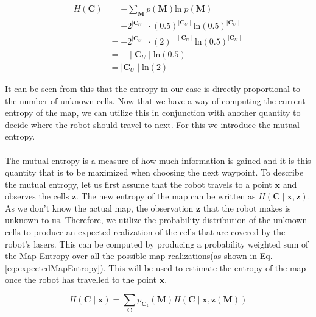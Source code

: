 \documentclass[a4paper,12pt]{article}
\begin{document}
			\begin{equation}
				\begin{split}
					H \left(\textbf{C}\right) &= - \sum_{\textbf{M}} p\left(\textbf{M}\right)\text{ln} \; p\left(\textbf{M}\right) \\
					&= - 2^{\mid \textbf{C}_U \mid} \cdot \left(0.5\right)^{\mid \textbf{C}_U \mid} \text{ln} \left(0.5\right)^{\mid \textbf{C}_U \mid} \\
					&= - 2^{\mid \textbf{C}_U \mid} \cdot \left(2\right)^{-\mid \textbf{C}_U \mid} \text{ln} \left(0.5\right)^{\mid \textbf{C}_U \mid} \\
					&= - \mid \textbf{C}_U \mid \text{ln} \left(0.5\right) \\
					&= \mid \textbf{C}_U \mid \text{ln} \left(2\right)
				\end{split}
				\label{eq:mapEntropy2}
			\end{equation}

			It can be seen from this that the entropy in our case is directly proportional to the number of unknown cells. Now that we have a way of computing the current entropy of the map, we can utilize this in conjunction with another quantity to decide where the robot should travel to next. For this we introduce the mutual entropy. 
			\\
			\\
			The mutual entropy is a measure of how much information is gained and it is this quantity that is to be maximized when choosing the next waypoint. To describe the mutual entropy, let us first assume that the robot travels to a point $\textbf{x}$ and observes the cells $\textbf{z}$. The new entropy of the map can be written as $H\left(\textbf{C}\mid\textbf{x},\textbf{z}\right)$. As we don't know the actual map, the observation $\textbf{z}$ that the robot makes is unknown to us. Therefore, we utilize the probability distribution of the unknown cells to produce an expected realization of the cells that are covered by the robot's lasers. This can be computed by producing a probability weighted sum of the Map Entropy over all the possible map realizations(as shown in Eq. \ref{eq:expectedMapEntropy}). This will be used to estimate the entropy of the map once the robot has travelled to the point $\textbf{x}$. 

			\begin{equation}
				H(\textbf{C}\mid\textbf{x}) = \sum_{\textbf{C}} p_{\textbf{C}_k}(\textbf{M})H(\textbf{C}\mid\textbf{x},\textbf{z}(\textbf{M}))
				\label{eq:expectedMapEntropy}
			\end{equation}
\end{document}
